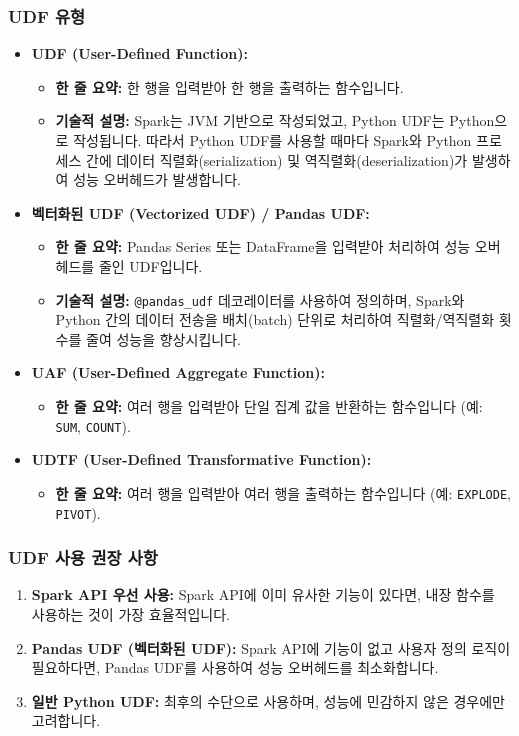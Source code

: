 \documentclass[11pt,a4paper]{article}
\theoremstyle{definition}
\begin{document}
\subsubsection{UDF 유형}
\begin{itemize}
    \item \textbf{UDF (User-Defined Function):}
    \begin{itemize}
        \item \textbf{한 줄 요약:} 한 행을 입력받아 한 행을 출력하는 함수입니다.
        \item \textbf{기술적 설명:} Spark는 JVM 기반으로 작성되었고, Python UDF는 Python으로 작성됩니다. 따라서 Python UDF를 사용할 때마다 Spark와 Python 프로세스 간에 데이터 직렬화(serialization) 및 역직렬화(deserialization)가 발생하여 성능 오버헤드가 발생합니다.
    \end{itemize}
    \item \textbf{벡터화된 UDF (Vectorized UDF) / Pandas UDF:}
    \begin{itemize}
        \item \textbf{한 줄 요약:} Pandas Series 또는 DataFrame을 입력받아 처리하여 성능 오버헤드를 줄인 UDF입니다.
        \item \textbf{기술적 설명:} \texttt{@pandas_udf} 데코레이터를 사용하여 정의하며, Spark와 Python 간의 데이터 전송을 배치(batch) 단위로 처리하여 직렬화/역직렬화 횟수를 줄여 성능을 향상시킵니다.
    \end{itemize}
    \item \textbf{UAF (User-Defined Aggregate Function):}
    \begin{itemize}
        \item \textbf{한 줄 요약:} 여러 행을 입력받아 단일 집계 값을 반환하는 함수입니다 (예: \texttt{SUM}, \texttt{COUNT}).
    \end{itemize}
    \item \textbf{UDTF (User-Defined Transformative Function):}
    \begin{itemize}
        \item \textbf{한 줄 요약:} 여러 행을 입력받아 여러 행을 출력하는 함수입니다 (예: \texttt{EXPLODE}, \texttt{PIVOT}).
    \end{itemize}
\end{itemize}

\subsubsection{UDF 사용 권장 사항}
\begin{enumerate}
    \item \textbf{Spark API 우선 사용:} Spark API에 이미 유사한 기능이 있다면, 내장 함수를 사용하는 것이 가장 효율적입니다.
    \item \textbf{Pandas UDF (벡터화된 UDF):} Spark API에 기능이 없고 사용자 정의 로직이 필요하다면, Pandas UDF를 사용하여 성능 오버헤드를 최소화합니다.
    \item \textbf{일반 Python UDF:} 최후의 수단으로 사용하며, 성능에 민감하지 않은 경우에만 고려합니다.
\end{enumerate}
\end{document}
